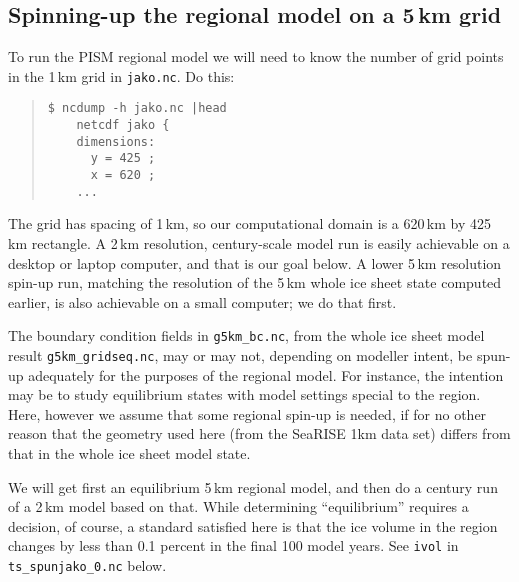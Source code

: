 \subsection*{Spinning-up the regional model on a 5\,km grid}
To run the PISM regional model we will need to know the number of grid points in the 1\,km grid in \texttt{jako.nc}.  Do this:
\begin{quote}\small
\begin{verbatim}
$ ncdump -h jako.nc |head
    netcdf jako {
    dimensions:
      y = 425 ;
      x = 620 ;
    ...
\end{verbatim}
\normalsize\end{quote}
The grid has spacing of 1\,km, so our computational domain is a 620\,km by 425\,km rectangle.  A 2\,km resolution, century-scale model run is easily achievable on a desktop or laptop computer, and that is our goal below.  A lower 5\,km resolution spin-up run, matching the resolution of the 5\,km whole ice sheet state computed earlier, is also achievable on a small computer; we do that first.

The boundary condition fields in \texttt{g5km_bc.nc}, from the whole ice sheet model result  \texttt{g5km_gridseq.nc}, may or may not, depending on modeller intent, be spun-up adequately for the purposes of the regional model.  For instance, the intention may be to study equilibrium states with model settings special to the region.  Here, however we assume that some regional spin-up is needed, if for no other reason that the geometry used here (from the SeaRISE 1km data set) differs from that in the whole ice sheet model state.

We will get first an equilibrium 5\,km regional model, and then do a century run of a 2\,km model based on that.  While determining ``equilibrium'' requires a decision, of course, a standard satisfied here is that the ice volume in the region changes by less than 0.1 percent in the final 100 model years.  See \texttt{ivol} in \texttt{ts_spunjako_0.nc} below.

